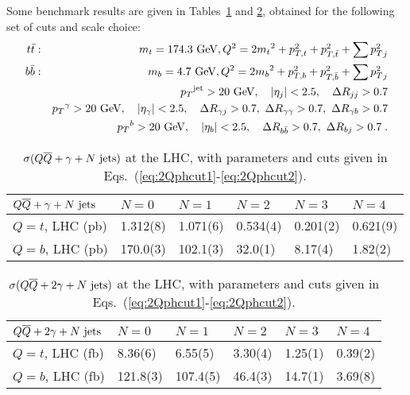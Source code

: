 \documentclass[paper]{JHEP3}
\newcommand{\gev}{\mbox{GeV}}
\newcommand{\ccaption}[2]{
    \begin{center}
    \parbox{0.85\textwidth}{
      \caption[#1]{\small{{#2}}}
      }
    \end{center}
    }
\def    \ba             {\begin{eqnarray}}
\def    \ea             {\end{eqnarray}}
\def    \gev            {\mbox{$\mathrm{GeV}$}}
\def    \bbar   {\bar{b}}
\def    \tbar   {\bar{t}}
\def    \Qbar   {\overline{Q}}
\def    \mt             {\mbox{$m_t$}}
\def    \mb             {\mbox{$m_b$}}
\def    \pt             {\mbox{$p_T$}}
\def    \ptsq           {\mbox{$p^2_T$}}
\def    \ptbsq           {\mbox{$p^2_{T,b}$}}
\def    \ptbbsq           {\mbox{$p^2_{T,\bar{b}}$}}
\def    \pttsq           {\mbox{$p^2_{T, t}$}}
\def    \pttbsq           {\mbox{$p^2_{T, \bar{t}}$}}
\begin{document}
Some benchmark results are given in Tables~\ref{tab:QQphxs} and 
\ref{tab:QQ2phxs}, 
obtained
for the following set of cuts and scale choice:
\ba \label{eq:2Qphcut1}
t\tbar: && \mt=174.3~\gev, Q^2=2\mt^2 + \pttsq+\pttbsq + \sum \ptsq_j
\\
b\bbar: && \mb=4.7~\gev, Q^2=2\mb^2 + \ptbsq+\ptbbsq+\sum \ptsq_j
\\
        && \pt^{\rm jet}>20~\gev, \quad \vert \eta_j\vert < 2.5, \quad \Delta
        R_{jj} >0.7
\\
        && \pt^{\gamma}>20~\gev, \quad \vert \eta_\gamma\vert < 2.5, 
           \quad \Delta R_{\gamma j} > 0.7, \, \, 
                 \Delta R_{\gamma \gamma} > 0.7, \, \, 
                 \Delta R_{\gamma b} >0.7
\\
        && \pt^{b}>20~\gev, \quad \vert \eta_b \vert < 2.5, \quad \Delta
        R_{b\bbar} >0.7, \, \, \Delta R_{bj} >0.7 \; .
\label{eq:2Qphcut2}
\ea
{\renewcommand{\arraystretch}{1.2}
\begin{table}
\begin{center}
\begin{tabular}{||l|l|l|l|l|l||}\hline
$Q \Qbar +\gamma + N~{\rm jets}$  & $N= 0$  & 
$N = 1$ & $N = 2$ & $N = 3$ & $N=4$ \\ 
\hline
$Q=t$, LHC (pb)  & 1.312(8) & 1.071(6) & 0.534(4) & 0.201(2)  & 0.621(9)\\ 
\hline
$Q=b$, LHC (pb) &  170.0(3) & 102.1(3) & 32.0(1) & 8.17(4) & 1.82(2)  \\ 
\hline
\end{tabular}            
\ccaption{}{\label{tab:QQphxs} $\sigma(Q \Qbar + \gamma + N~{\rm jets})$
at the LHC, with parameters and cuts given in 
Eqs.~(\ref{eq:2Qphcut1}-\ref{eq:2Qphcut2}).}
\end{center}
\end{table}}

{\renewcommand{\arraystretch}{1.2}
\begin{table}
\begin{center}
\begin{tabular}{||l|l|l|l|l|l||}\hline
$Q \Qbar + 2 \gamma + N~{\rm jets}$  & $N= 0$  & 
$N = 1$ & $N = 2$ & $N = 3$ & $N=4$ \\ 
\hline
$Q=t$, LHC (fb)  & 8.36(6) & 6.55(5) & 3.30(4) & 1.25(1)  & 0.39(2) \\ 
\hline
$Q=b$, LHC (fb) &  121.8(3) & 107.4(5) & 46.4(3) & 14.7(1) & 3.69(8)  \\ 
\hline
\end{tabular}            
\ccaption{}{\label{tab:QQ2phxs} $\sigma(Q \Qbar + 2 \gamma + N~{\rm jets})$
at the LHC, with parameters and cuts given in 
Eqs.~(\ref{eq:2Qphcut1}-\ref{eq:2Qphcut2}).}
\end{center}
\end{table}}
\end{document}

